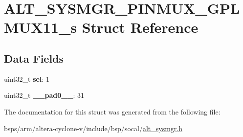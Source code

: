 \hypertarget{structALT__SYSMGR__PINMUX__GPLMUX11__s}{}\section{A\+L\+T\+\_\+\+S\+Y\+S\+M\+G\+R\+\_\+\+P\+I\+N\+M\+U\+X\+\_\+\+G\+P\+L\+M\+U\+X11\+\_\+s Struct Reference}
\label{structALT__SYSMGR__PINMUX__GPLMUX11__s}
\subsection*{Data Fields}
\begin{DoxyCompactItemize}
\item 
\mbox{\label{structALT__SYSMGR__PINMUX__GPLMUX11__s_a71346cfb4c36713d9cf6f27d7b040f1a}} 
uint32\+\_\+t {\bfseries sel}\+: 1
\item 
\mbox{\label{structALT__SYSMGR__PINMUX__GPLMUX11__s_a564cd69f1897abe14d2b3f9d9e88701e}} 
uint32\+\_\+t {\bfseries \+\_\+\+\_\+pad0\+\_\+\+\_\+}\+: 31
\end{DoxyCompactItemize}


The documentation for this struct was generated from the following file\+:\begin{DoxyCompactItemize}
\item 
bsps/arm/altera-\/cyclone-\/v/include/bsp/socal/\mbox{\hyperlink{alt__sysmgr_8h}{alt\+\_\+sysmgr.\+h}}\end{DoxyCompactItemize}
